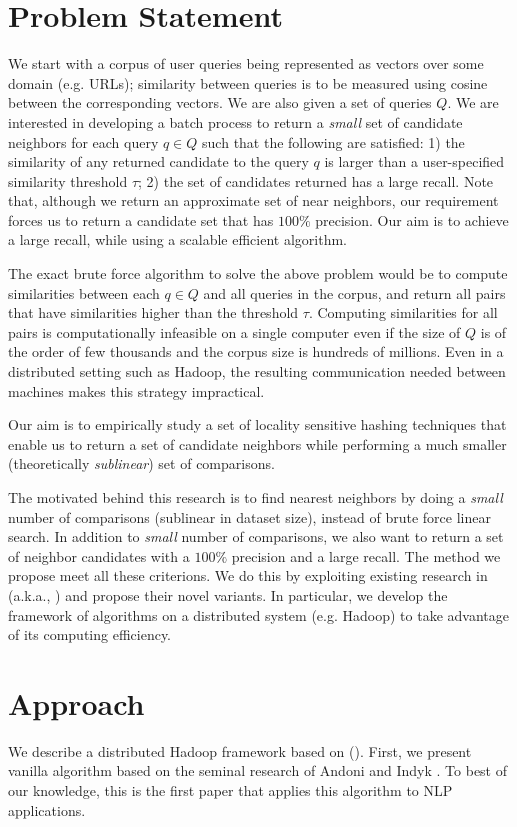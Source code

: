 
\section{Problem Statement}
We start with a corpus of user queries being represented as vectors
over some domain (e.g. URLs); similarity between queries is to be measured using cosine between the corresponding
vectors. We are also given a set of queries $Q$. 
We are interested in developing a batch process to return a \emph{small}
set of candidate neighbors for each query $q \in Q$ such that the following
are satisfied: 1) the similarity of any returned candidate to the query $q$ is larger than a user-specified 
similarity threshold $\tau$; 2) the set of candidates returned has a large recall. 
Note that, although we return an approximate set of near neighbors, our requirement forces us to 
return a candidate set that has $100\%$ precision. Our aim is to achieve a large recall, while using
a scalable efficient algorithm.

The exact brute force algorithm to solve the above problem would be to compute
similarities between each $q\in Q$ and all queries in the corpus, and return 
all pairs that have similarities higher than the threshold $\tau$. Computing similarities
for all pairs is computationally infeasible on a single computer even if the size of $Q$ is of the order of few thousands
and the corpus size is hundreds of millions. Even in a distributed setting such as Hadoop, the 
resulting communication needed between machines makes this strategy impractical. 

Our aim is to empirically study a set of locality sensitive hashing techniques
that enable us to return a set of candidate neighbors while performing
a much smaller (theoretically \emph{sublinear}) set of comparisons. 


The motivated behind this research is to find nearest neighbors by doing a 
\emph{small} number of comparisons (sublinear in dataset size), instead of brute force linear search. 
In addition to \emph{small} number of comparisons, we also want to 
return a set of neighbor candidates with a $100\%$ precision and a large recall. 
The method we propose meet all these criterions. We do this by exploiting 
existing research in \lshf (a.k.a., \lsh) and propose their novel variants. 
In particular, we develop the framework of  \lsh algorithms on a distributed 
system (e.g. Hadoop) to take advantage of its computing efficiency.



\section{Approach}
\label{sec:approach}
We describe a distributed Hadoop framework based on \lshf (\lsh). 
First, we present vanilla \lsh algorithm based on the seminal research of Andoni and Indyk  . To best of our knowledge, this is the first paper that applies this algorithm to NLP applications. 


